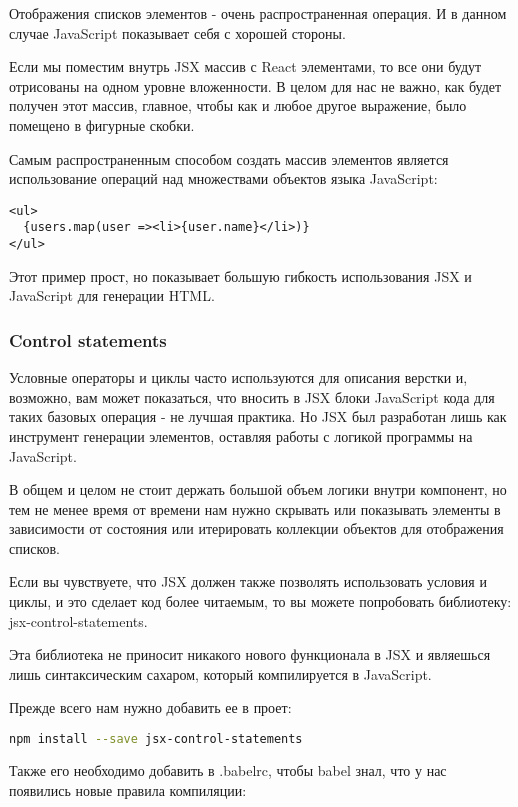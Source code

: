 Отображения списков элементов - очень распространенная операция. И в данном случае JavaScript показывает себя с хорошей стороны.

Если мы поместим внутрь JSX массив с React элементами, то все они будут отрисованы на одном уровне вложенности. В целом для нас не важно, как будет получен этот массив, главное, чтобы как и любое другое выражение, было помещено в фигурные скобки.

Самым распространенным способом создать массив элементов является использование операций над множествами объектов языка JavaScript:

\begin{lstlisting}
<ul>
  {users.map(user =><li>{user.name}</li>)}
</ul>
\end{lstlisting}

Этот пример прост, но показывает большую гибкость использования JSX и JavaScript для генерации HTML.

\subsubsection*{Control statements}

Условные операторы и циклы часто используются для описания верстки и, возможно, вам может показаться, что вносить в JSX блоки JavaScript кода для таких базовых операция - не лучшая практика. Но JSX был разработан лишь как инструмент генерации элементов, оставляя работы с логикой программы на JavaScript.

В общем и целом не стоит держать большой объем логики внутри компонент, но тем не менее время от времени нам нужно скрывать или показывать элементы в зависимости от состояния или итерировать коллекции объектов для отображения списков. 

Если вы чувствуете, что JSX должен также позволять использовать условия и циклы, и это сделает код более читаемым, то вы можете попробовать библиотеку: jsx-control-statements.

Эта библиотека не приносит никакого нового функционала в JSX и являешься лишь синтаксическим сахаром, который компилируется в JavaScript.

Прежде всего нам нужно добавить ее в проет:

\begin{lstlisting}[language=bash]
npm install --save jsx-control-statements
\end{lstlisting}

Также его необходимо добавить в .babelrc, чтобы babel знал, что у нас появились новые правила компиляции:

